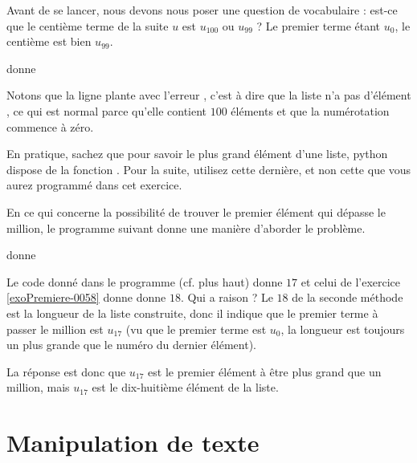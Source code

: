 Avant de se lancer, nous devons nous poser une question de vocabulaire : est-ce que le centième terme de la suite \( u\) est \( u_{100}\) ou \( u_{99}\) ? Le premier terme étant \( u_0\), le centième est bien \( u_{99}\).





donne



Notons que la ligne  plante avec l'erreur , c'est à dire que la liste  n'a pas d'élément , ce qui est normal parce qu'elle contient \( 100\) éléments et que la numérotation commence à zéro.




    En pratique, sachez que pour savoir le plus grand élément d'une liste, python dispose de la fonction . Pour la suite, utilisez cette dernière, et non cette que vous aurez programmé dans cet exercice.



En ce qui concerne la possibilité de trouver le premier élément qui dépasse le million, le programme suivant donne une manière d'aborder le problème.



donne




\begin{remark}
    
    Le code donné dans le programme  (cf. plus haut) donne \( 17\) et celui de l'exercice \ref{exoPremiere-0058} donne donne \( 18\). Qui a raison ? Le \( 18\) de la seconde méthode est la longueur de la liste construite, donc il indique que le premier terme à passer le million est \( u_{17}\) (vu que le premier terme est \( u_0\), la longueur est toujours un plus grande que le numéro du dernier élément).

La réponse est donc que \( u_{17}\) est le premier élément à être plus grand que un million, mais \( u_{17}\) est le dix-huitième élément de la liste.

\end{remark}


\chapter{Manipulation de texte}

